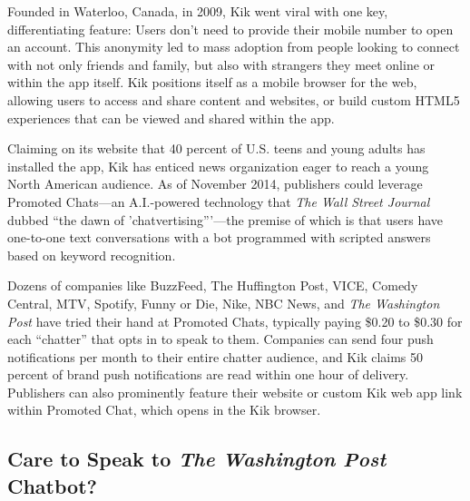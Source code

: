 \documentclass[notoc, symmetric, nobib, nols]{towcenter-guideto-book}
\begin{document}
Founded in Waterloo, Canada, in 2009, Kik went viral with one key, differentiating feature: Users don't need to provide their mobile number to open an account. This anonymity led to mass adoption from people looking to connect with not only friends and family, but also with strangers they meet online or within the app itself. Kik positions itself as a mobile browser for the web, allowing users to access and share content and websites, or build custom HTML5 experiences that can be viewed and shared within the app.

Claiming on its website that 40 percent of U.S. teens and young adults has installed the app, Kik has enticed news organization eager to reach a young North American audience.\autocite{ForbesKik} As of November 2014, publishers could leverage Promoted Chats---an A.I.-powered technology that \textit{The Wall Street Journal} dubbed ``the dawn of 'chatvertising'''\autocite{WSJKik}---the premise of which is that users have one-to-one text conversations with a bot programmed with scripted answers based on keyword recognition. 

Dozens of companies like BuzzFeed, The Huffington Post, VICE, Comedy Central, MTV, Spotify, Funny or Die, Nike, NBC News, and \textit{The Washington Post} have tried their hand at Promoted Chats, typically paying \$0.20 to \$0.30 for each ``chatter'' that opts in to speak to them. Companies can send four push notifications per month to their entire chatter audience, and Kik claims 50 percent of brand push notifications are read within one hour of delivery. Publishers can also prominently feature their website or custom Kik web app link within Promoted Chat, which opens in the Kik browser.

\subsection[Care to Speak to the Washington Post Chatbot?]{Care to Speak to \textit{The Washington Post} Chatbot?}
\end{document}
